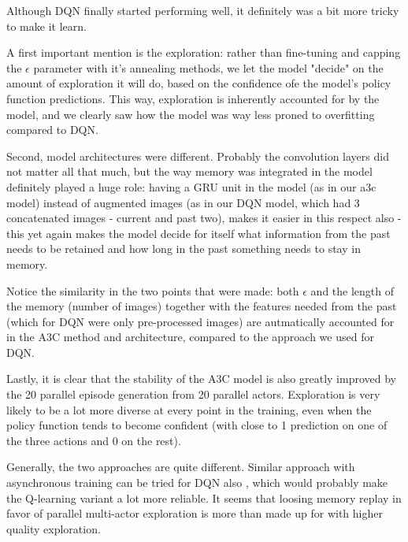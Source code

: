 Although DQN finally started performing well, it definitely was a bit more tricky to make it learn. 

\medskip
\noindent
A first important mention is the exploration: rather than fine-tuning and capping the $\epsilon$ parameter with it's annealing methods, we let the model "decide" on the amount of exploration it will do, based on the confidence ofe the model's policy function predictions. This way, exploration is inherently accounted for by the model, and we clearly saw how the model was way less proned to overfitting compared to DQN.

\medskip
\noindent
Second, model architectures were different. Probably the convolution layers did not matter all that much, but the way memory was integrated in the model definitely played a huge role: having a GRU unit in the model (as in our a3c model) instead of augmented images (as in our DQN model, which had 3 concatenated images - current and past two), makes it easier in this respect also - this yet again makes the model decide for itself what information from the past needs to be retained and how long in the past something needs to stay in memory. 

\medskip
\noindent
Notice the similarity in the two points that were made: both $\epsilon$ and the length of the memory (number of images) together with the features needed from the past (which for DQN were only pre-processed images) are autmatically accounted for in the A3C method and architecture, compared to the approach we used for DQN.

\medskip
\noindent
Lastly, it is clear that the stability of the A3C model is also greatly improved by the 20 parallel episode generation from 20 parallel actors. Exploration is very likely to be a lot more diverse at every point in the training, even when the policy function tends to become confident (with close to 1 prediction on one of the three actions and 0 on the rest).

\medskip
\noindent
Generally, the two approaches are quite different. Similar approach with asynchronous training can be tried for DQN also \cite{A3C}, which 	would probably make the Q-learning variant a lot more reliable. It seems that loosing memory replay in favor of parallel multi-actor exploration is more than made up for with higher quality exploration.